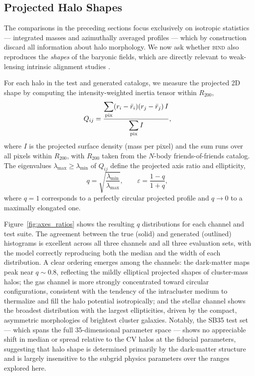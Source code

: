\documentclass[linenumbers,trackchanges, twocolumn]{aastex701}
\begin{document}
\subsection{Projected Halo Shapes}
\label{subsec:shapes}



The comparisons in the preceding sections focus exclusively on isotropic statistics — integrated masses and azimuthally averaged profiles — which by construction discard all information about halo morphology. We now ask whether \textsc{bind} also reproduces the \textit{shapes} of the baryonic fields, which are directly relevant to weak-lensing intrinsic alignment studies \citep[e.g.,][]{troxel2015intrinsic, joachimi2015intrinsic}.

For each halo in the test and generated catalogs, we measure the projected 2D shape by computing the intensity-weighted inertia tensor within $R_{200}$,
\begin{equation}
    Q_{ij} = \frac{\displaystyle\sum_{\rm pix}
                   (r_i - \bar{r}_i)(r_j - \bar{r}_j)\,I}
                  {\displaystyle\sum_{\rm pix} I},
    \label{eq:inertia}
\end{equation}
where $I$ is the projected surface density (mass per pixel) and the sum runs over all pixels within $R_{200}$, with $R_{200}$ taken from the $N$-body friends-of-friends catalog. The eigenvalues $\lambda_{\max} \geq \lambda_{\min}$ of $Q_{ij}$ define the projected axis ratio and ellipticity,
\begin{equation}
    q = \sqrt{\frac{\lambda_{\min}}{\lambda_{\max}}}, \qquad
    \varepsilon = \frac{1-q}{1+q},
    \label{eq:shapes}
\end{equation}
where $q=1$ corresponds to a perfectly circular projected profile and $q \to 0$ to a maximally elongated one.

Figure~\ref{fig:axes_ratios} shows the resulting $q$ distributions for each channel and test suite. The agreement between the true (solid) and generated (outlined) histograms is excellent across all three channels and all three evaluation sets, with the model correctly reproducing both the median and the width of each distribution. A clear ordering emerges among the channels: the dark-matter maps peak near $q \sim 0.8$, reflecting the mildly elliptical projected shapes of cluster-mass halos; the gas channel is more strongly concentrated toward circular configurations, consistent with the tendency of the intracluster medium to thermalize and fill the halo potential isotropically; and the stellar channel shows the broadest distribution with the largest ellipticities, driven by the compact, asymmetric morphologies of brightest cluster galaxies. Notably, the SB35 test set — which spans the full 35-dimensional parameter space — shows no appreciable shift in median or spread relative to the CV halos at the fiducial parameters, suggesting that halo shape is determined primarily by the dark-matter structure and is largely insensitive to the subgrid physics parameters over the ranges explored here.
\end{document}
